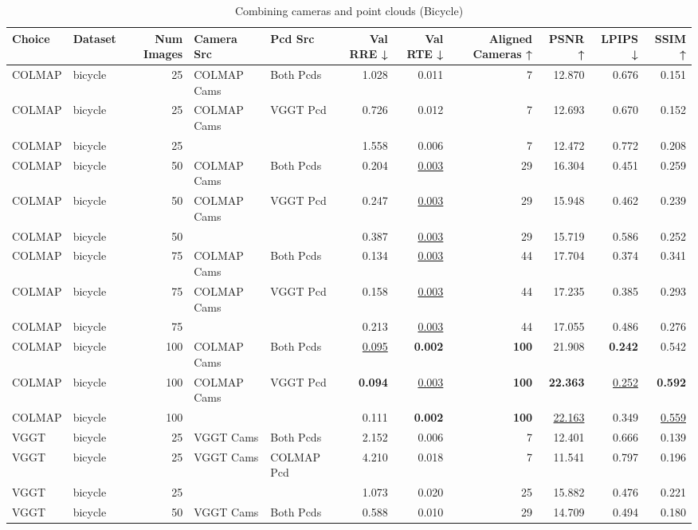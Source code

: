 \begin{table}[H]
\caption{Combining cameras and point clouds (Bicycle)}
\label{tab:07_combined_bicycle}
\centering
\scriptsize
\begin{tabular}{llrllrrrrrr}
\toprule
Choice & Dataset & Num Images & Camera Src & Pcd Src & Val RRE ↓ & Val RTE ↓ & Aligned Cameras ↑ & PSNR ↑ & LPIPS ↓ & SSIM ↑ \\
\midrule
COLMAP & bicycle & 25 & COLMAP Cams & Both Pcds & 1.028 & 0.011 & 7 & 12.870 & 0.676 & 0.151 \\
COLMAP & bicycle & 25 & COLMAP Cams & VGGT Pcd & 0.726 & 0.012 & 7 & 12.693 & 0.670 & 0.152 \\
COLMAP & bicycle & 25 &  &  & 1.558 & 0.006 & 7 & 12.472 & 0.772 & 0.208 \\
COLMAP & bicycle & 50 & COLMAP Cams & Both Pcds & 0.204 & \underline{0.003} & 29 & 16.304 & 0.451 & 0.259 \\
COLMAP & bicycle & 50 & COLMAP Cams & VGGT Pcd & 0.247 & \underline{0.003} & 29 & 15.948 & 0.462 & 0.239 \\
COLMAP & bicycle & 50 &  &  & 0.387 & \underline{0.003} & 29 & 15.719 & 0.586 & 0.252 \\
COLMAP & bicycle & 75 & COLMAP Cams & Both Pcds & 0.134 & \underline{0.003} & 44 & 17.704 & 0.374 & 0.341 \\
COLMAP & bicycle & 75 & COLMAP Cams & VGGT Pcd & 0.158 & \underline{0.003} & 44 & 17.235 & 0.385 & 0.293 \\
COLMAP & bicycle & 75 &  &  & 0.213 & \underline{0.003} & 44 & 17.055 & 0.486 & 0.276 \\
COLMAP & bicycle & 100 & COLMAP Cams & Both Pcds & \underline{0.095} & \textbf{0.002} & \textbf{100} & 21.908 & \textbf{0.242} & 0.542 \\
COLMAP & bicycle & 100 & COLMAP Cams & VGGT Pcd & \textbf{0.094} & \underline{0.003} & \textbf{100} & \textbf{22.363} & \underline{0.252} & \textbf{0.592} \\
COLMAP & bicycle & 100 &  &  & 0.111 & \textbf{0.002} & \textbf{100} & \underline{22.163} & 0.349 & \underline{0.559} \\
VGGT & bicycle & 25 & VGGT Cams & Both Pcds & 2.152 & 0.006 & 7 & 12.401 & 0.666 & 0.139 \\
VGGT & bicycle & 25 & VGGT Cams & COLMAP Pcd & 4.210 & 0.018 & 7 & 11.541 & 0.797 & 0.196 \\
VGGT & bicycle & 25 &  &  & 1.073 & 0.020 & 25 & 15.882 & 0.476 & 0.221 \\
VGGT & bicycle & 50 & VGGT Cams & Both Pcds & 0.588 & 0.010 & 29 & 14.709 & 0.494 & 0.180 \\

\end{tabular}
\end{table}
